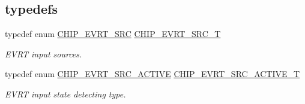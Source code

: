 \subsection*{\textquotesingle{}typedefs\textquotesingle{}}
\begin{DoxyCompactItemize}
\item 
typedef enum \hyperlink{group___e_v_r_t__18_x_x__43_x_x_gad3cd727405aa5446c2319375ad1b7276}{C\+H\+I\+P\+\_\+\+E\+V\+R\+T\+\_\+\+S\+RC} \hyperlink{group___e_v_r_t__18_x_x__43_x_x_gaa43c01b5839b8ef001017d1d1150b16d}{C\+H\+I\+P\+\_\+\+E\+V\+R\+T\+\_\+\+S\+R\+C\+\_\+T}
\begin{DoxyCompactList}\small\item\em E\+V\+RT input sources. \end{DoxyCompactList}\item 
typedef enum \hyperlink{group___e_v_r_t__18_x_x__43_x_x_ga721fc5bcb9c562312b880ba4cd5b96a6}{C\+H\+I\+P\+\_\+\+E\+V\+R\+T\+\_\+\+S\+R\+C\+\_\+\+A\+C\+T\+I\+VE} \hyperlink{group___e_v_r_t__18_x_x__43_x_x_ga41e06d681302344e72fc1eca77f708b4}{C\+H\+I\+P\+\_\+\+E\+V\+R\+T\+\_\+\+S\+R\+C\+\_\+\+A\+C\+T\+I\+V\+E\+\_\+T}
\begin{DoxyCompactList}\small\item\em E\+V\+RT input state detecting type. \end{DoxyCompactList}\end{DoxyCompactItemize}
